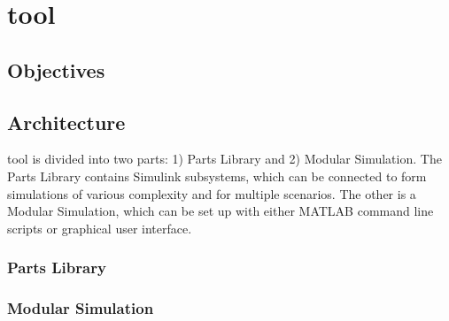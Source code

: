 \section{\acf{tool}}\label{sec:toolbox}

\subsection{Objectives}\label{toolbox:objectives}


\subsection{Architecture}
    \ac{tool} is divided into two parts: 1) Parts Library and 2) Modular Simulation. The Parts Library contains Simulink subsystems, which can be connected to form simulations of various complexity and for multiple scenarios. The other is a Modular Simulation, which can be set up with either MATLAB command line scripts or graphical user interface.

    \subsubsection{Parts Library}

    \subsubsection{Modular Simulation}